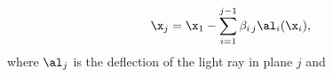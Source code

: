 \begin{equation}
\x_j=\x_1 - \sum\limits_{i=1}^{j-1} \beta_{i\,j} \al_i(\x_i),  
\label{eq:mp_full}
\end{equation}
where $\al_j$ is the deflection of the light ray in plane $j$ and